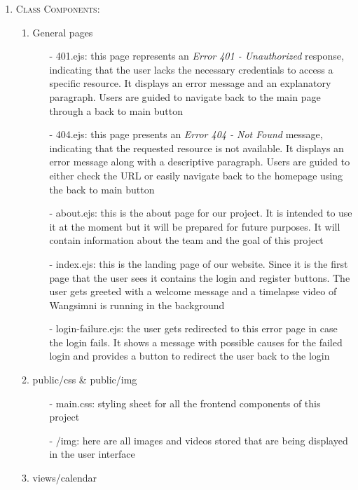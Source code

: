 \documentclass[conference]{IEEEtran}
\begin{document}
\begin{enumerate}
    \item \textsc{Class Components:}
        \begin{enumerate}
            \item General pages
                \begin{itemize}
                    \item[-] 401.ejs: this page represents an \textit{Error 401 - Unauthorized} response, indicating that the user lacks the necessary credentials to access a specific resource. It displays an error message and an explanatory paragraph. Users are guided to navigate back to the main page through a back to main button
                    \item[-] 404.ejs: this page presents an \textit{Error 404 - Not Found} message, indicating that the requested resource is not available. It displays an error message along with a descriptive paragraph. Users are guided to either check the URL or easily navigate back to the homepage using the back to main button
                    \item[-] about.ejs: this is the about page for our project. It is intended to use it at the moment but it will be prepared for future purposes. It will contain information about the team and the goal of this project
                    \item[-] index.ejs: this is the landing page of our website. Since it is the first page that the user sees it contains the login and register buttons. The user gets greeted with a welcome message and a timelapse video of Wangsimni is running in the background
                    \item[-] login-failure.ejs: the user gets redirected to this error page in case the login fails. It shows a message with possible causes for the failed login and provides a button to redirect the user back to the login
                \end{itemize}
            \item public/css \& public/img
                \begin{itemize}
                    \item[-] main.css: styling sheet for all the frontend components of this project
                    \item[-] /img: here are all images and videos stored that are being displayed in the user interface
                \end{itemize}
            \item views/calendar
                \begin{itemize}

\end{itemize}
\end{enumerate}
\end{enumerate}
\end{document}
